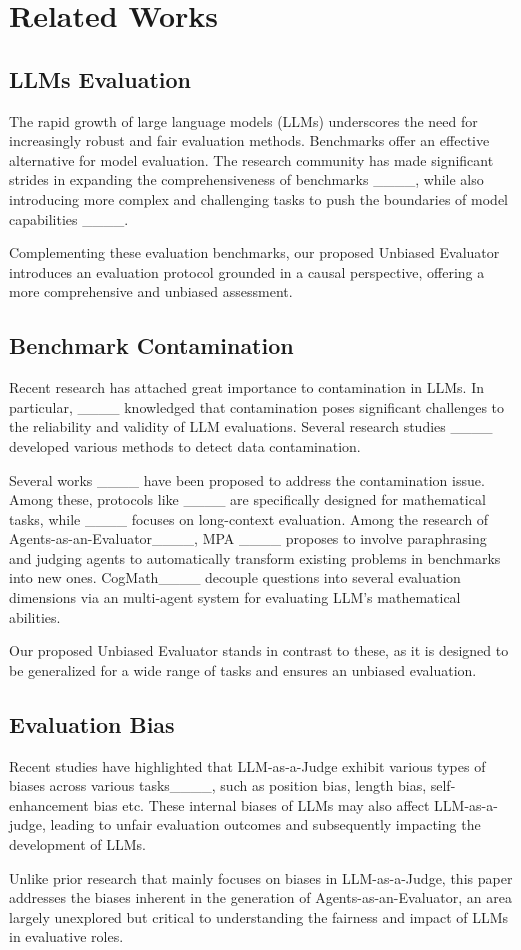 \section{Related Works}
\subsection{LLMs Evaluation}
The rapid growth of large language models (LLMs) underscores the need for increasingly robust and fair evaluation methods.
Benchmarks offer an effective alternative for model evaluation. The research community has made significant strides in expanding the comprehensiveness of benchmarks ____, while also introducing more complex and challenging tasks to push the boundaries of model capabilities ____. 

Complementing these evaluation benchmarks, our proposed Unbiased Evaluator introduces an evaluation protocol grounded in a causal perspective, offering a more comprehensive and unbiased assessment.



\subsection{Benchmark Contamination}
Recent research has attached great importance to contamination in LLMs. In particular, ____ knowledged that contamination poses significant challenges to the reliability and validity of LLM evaluations. Several research studies ____ developed various methods to detect data contamination.

Several works ____ have been proposed to address the contamination issue. Among these, protocols like ____ are specifically designed for mathematical tasks, while ____ focuses on long-context evaluation.
Among the research of Agents-as-an-Evaluator____, MPA ____ proposes to involve paraphrasing and judging agents to automatically transform existing problems in benchmarks into new ones. CogMath____ decouple questions into several evaluation dimensions via an multi-agent system for evaluating LLM's mathematical
abilities. 

Our proposed Unbiased Evaluator stands in contrast to these, as it is designed to be generalized for a wide range of tasks and ensures an unbiased evaluation.

\subsection{Evaluation Bias}
Recent studies have highlighted that LLM-as-a-Judge exhibit various types of biases across various tasks____, such as position bias, length bias, self-enhancement bias etc. These internal biases of LLMs may also affect LLM-as-a-judge, leading to unfair evaluation outcomes and subsequently impacting the development of LLMs. 

Unlike prior research that mainly focuses on biases in LLM-as-a-Judge, this paper addresses the biases inherent in the generation of Agents-as-an-Evaluator, an area largely unexplored but critical to understanding the fairness and impact of LLMs in evaluative roles.